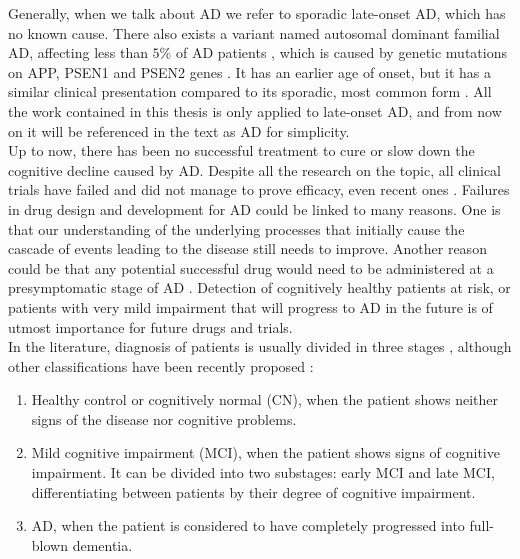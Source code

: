 Generally, when we talk about AD we refer to sporadic late-onset AD, which has no known cause. There also exists a variant named autosomal dominant familial AD, affecting less than $5\%$ of AD patients \cite{Bird1993}, which is caused by genetic mutations on APP, PSEN1 and PSEN2 genes \cite{Campion1999}. It has an earlier age of onset, but it has a similar clinical presentation compared to its sporadic, most common form \cite{Ryan2016}. All the work contained in this thesis is only applied to late-onset AD, and from now on it will be referenced in the text as AD for simplicity. \\

Up to now, there has been no successful treatment to cure or slow down the cognitive decline caused by AD. Despite all the research on the topic, all clinical trials have failed \cite{Mehta2017} and did not manage to prove efficacy, even recent ones \cite{Huang2020}. Failures in drug design and development for AD could be linked to many reasons. One is that our understanding of the underlying processes that initially cause the cascade of events leading to the disease still needs to improve. Another reason could be that any potential successful drug would need to be administered at a presymptomatic stage of AD \cite{Mehta2017,Huang2020}. Detection of cognitively healthy patients at risk, or patients with very mild impairment that will progress to AD in the future is of utmost importance for future drugs and trials. \\ 

In the literature, diagnosis of patients is usually divided in three stages \cite{Brookmeyer2007}, although other classifications have been recently proposed \cite{Jack2018}:

\begin{enumerate}\itemsep5pt
\item Healthy control or cognitively normal (CN), when the patient shows neither signs of the disease nor cognitive problems.
\item Mild cognitive impairment (MCI), when the patient shows signs of cognitive impairment. It can be divided into two substages: early MCI and late MCI, differentiating between patients by their degree of cognitive impairment.
\item AD, when the patient is considered to have completely progressed into full-blown dementia.
\end{enumerate}

